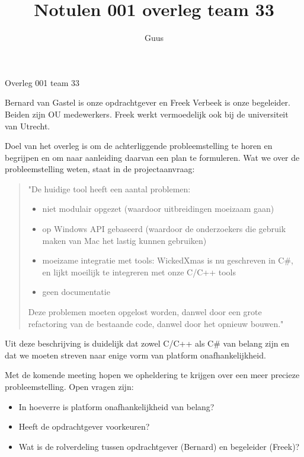 \documentclass{article}
\title{Notulen 001 overleg team 33}
\author{Guus}
\begin{document}

\begin{Minutes}{Overleg 001 team 33}

\maketitle%


Bernard van Gastel is onze opdrachtgever en Freek Verbeek is onze begeleider. Beiden zijn 
OU medewerkers. Freek werkt vermoedelijk ook bij de universiteit van Utrecht.

Doel van het overleg is om de achterliggende probleemstelling te horen en begrijpen en
om naar aanleiding daarvan een plan te formuleren. Wat we over de probleemstelling weten, staat
in de projectaanvraag:

\begin{quote}
"De huidige tool heeft een aantal problemen:
\begin{itemize}
\item niet modulair opgezet (waardoor uitbreidingen moeizaam gaan)
\item op Windows API gebaseerd (waardoor de onderzoekers die
			gebruik maken van Mac het lastig kunnen gebruiken)
\item moeizame integratie met tools: WickedXmas is nu geschreven
	in C\#, en lijkt moeilijk te integreren met onze C/C++ tools
\item geen documentatie
\end{itemize}
Deze problemen moeten opgelost worden, danwel door een grote
refactoring van de bestaande code, danwel door het opnieuw
bouwen."
\end{quote}

Uit deze beschrijving is duidelijk dat zowel C/C++ als C\# van belang zijn en dat we moeten streven naar 
enige vorm van platform onafhankelijkheid.

Met de komende meeting hopen we opheldering te krijgen over een meer precieze probleemstelling.
Open vragen zijn:

\begin{itemize}
\item In hoeverre is platform onafhankelijkheid van belang? 
\item Heeft de opdrachtgever voorkeuren?
\item Wat is de rolverdeling tussen opdrachtgever (Bernard) en begeleider (Freek)?
\end{itemize}


\end{Minutes}
\end{document}
